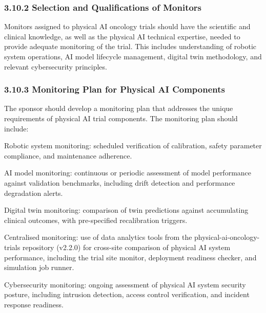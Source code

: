 \documentclass[11pt]{article}
\begin{document}
\subsubsection{3.10.2 Selection and Qualifications of Monitors}

Monitors assigned to physical AI oncology trials should have the scientific and clinical knowledge, as well as the physical AI technical expertise, needed to provide adequate monitoring of the trial. This includes understanding of robotic system operations, AI model lifecycle management, digital twin methodology, and relevant cybersecurity principles.

\subsubsection{3.10.3 Monitoring Plan for Physical AI Components}

The sponsor should develop a monitoring plan that addresses the unique requirements of physical AI trial components. The monitoring plan should include:

\begin{description}[leftmargin=2.5cm,style=sameline]

\item[(a)] Robotic system monitoring: scheduled verification of calibration, safety parameter compliance, and maintenance adherence.

\item[(b)] AI model monitoring: continuous or periodic assessment of model performance against validation benchmarks, including drift detection and performance degradation alerts.

\item[(c)] Digital twin monitoring: comparison of twin predictions against accumulating clinical outcomes, with pre-specified recalibration triggers.

\item[(d)] Centralised monitoring: use of data analytics tools from the physical-ai-oncology-trials repository (v2.2.0) for cross-site comparison of physical AI system performance, including the trial site monitor, deployment readiness checker, and simulation job runner.

\item[(e)] Cybersecurity monitoring: ongoing assessment of physical AI system security posture, including intrusion detection, access control verification, and incident response readiness.

\end{description}
\end{document}
